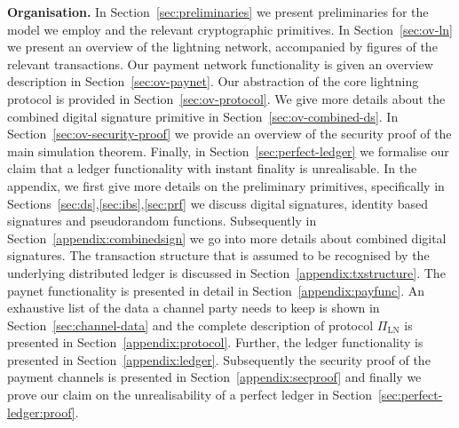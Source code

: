 \noindent \textbf{Organisation.} In Section~\ref{sec:preliminaries} we present
preliminaries for the model we employ and the relevant cryptographic primitives.
In Section~\ref{sec:ov-ln} we present an overview of the lightning network,
accompanied by figures of the relevant transactions. Our payment network
functionality is given an overview description in Section~\ref{sec:ov-paynet}.
Our abstraction of the core lightning protocol is provided in
Section~\ref{sec:ov-protocol}. We give more details about the combined digital
signature primitive in Section~\ref{sec:ov-combined-ds}. In
Section~\ref{sec:ov-security-proof} we provide an overview of the security
proof of the main simulation theorem. Finally, in
Section~\ref{sec:perfect-ledger} we formalise our claim that a ledger
functionality with instant finality is unrealisable. In the appendix, we first
give more details on the preliminary primitives, specifically in
Sections~\ref{sec:ds},\ref{sec:ibs},\ref{sec:prf} we discuss digital signatures,
identity based signatures and pseudorandom functions. Subsequently in
Section~\ref{appendix:combinedsign} we go into more details about combined
digital signatures. The transaction structure that is assumed to be recognised
by the underlying distributed ledger is discussed in
Section~\ref{appendix:txstructure}. The paynet functionality is presented in
detail in Section~\ref{appendix:payfunc}. An exhaustive list of the data a
channel party needs to keep is shown in Section~\ref{sec:channel-data} and the
complete description of protocol $\Pi_{\mathrm{LN}}$ is presented in
Section~\ref{appendix:protocol}. Further, the ledger functionality is presented
in Section~\ref{appendix:ledger}. Subsequently the security proof of the payment
channels is presented in Section~\ref{appendix:secproof} and finally we prove
our claim on the unrealisability of a perfect ledger in
Section~\ref{sec:perfect-ledger:proof}.

